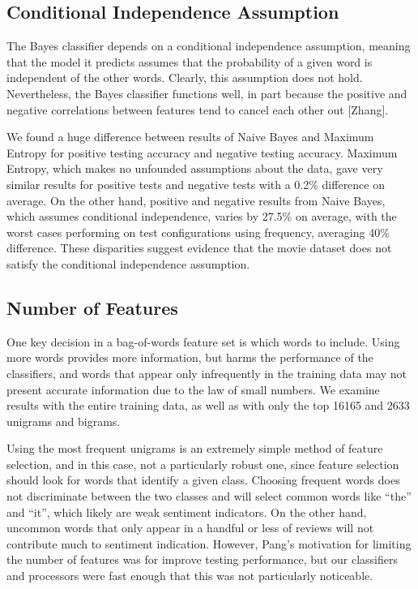 \documentclass[10pt,twocolumn,letterpaper]{article}
\begin{document}
\subsection{Conditional Independence Assumption}

The Bayes classifier depends on a conditional independence assumption, meaning that the model it predicts assumes that the probability of a given word is independent of the other words. Clearly, this assumption does not hold. Nevertheless, the Bayes classifier functions well, in part because the positive and negative correlations between features tend to cancel each other out [Zhang].

We found a huge difference between results of Naive Bayes and Maximum Entropy for positive testing accuracy and negative testing accuracy. Maximum Entropy, which makes no unfounded assumptions about the data, gave very similar results for positive tests and negative tests with a 0.2\% difference on average. On the other hand, positive and negative results from Naive Bayes, which assumes conditional independence, varies by 27.5\% on average, with the worst cases performing on test configurations using frequency, averaging 40\% difference. These disparities suggest evidence that the movie dataset does not satisfy the conditional independence assumption.

\subsection{Number of Features}

One key decision in a bag-of-words feature set is which words to include. Using more words provides more information, but harms the performance of the classifiers, and words that appear only infrequently in the training data may not present accurate information due to the law of small numbers. We examine results with the entire training data, as well as with only the top 16165 and 2633 unigrams and bigrams.

Using the most frequent unigrams is an extremely simple method of feature selection, and in this case, not a particularly robust one, since feature selection should look for words that identify a given class. Choosing frequent words does not discriminate between the two classes and will select common words like ``the'' and ``it'', which likely are weak sentiment indicators. On the other hand, uncommon words that only appear in a handful or less of reviews will not contribute much to sentiment indication. However, Pang’s motivation for limiting the number of features was for improve testing performance, but our classifiers and processors were fast enough that this was not particularly noticeable.
\end{document}
